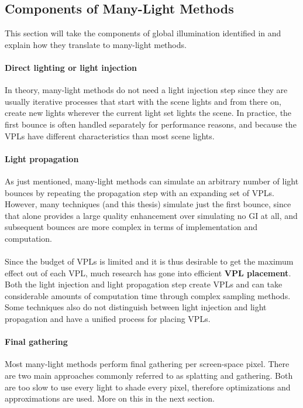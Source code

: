 \subsection{Components of Many-Light Methods}
This section will take the components of global illumination identified in  and explain how they translate to many-light methods.

\paragraph{Direct lighting or light injection}
In theory, many-light methods do not need a light injection step since they are usually iterative processes that start with the scene lights and from there on, create new lights wherever the current light set lights the scene. In practice, the first bounce is often handled separately for performance reasons, and because the VPLs have different characteristics than most scene lights.

\paragraph{Light propagation}
As just mentioned, many-light methods can simulate an arbitrary number of light bounces by repeating the propagation step with an expanding set of VPLs. However, many techniques (and this thesis) simulate just the first bounce, since that alone provides a large quality enhancement over simulating no GI at all, and subsequent bounces are more complex in terms of implementation and computation.
\\
\\
Since the budget of VPLs is limited and it is thus desirable to get the maximum effect out of each VPL, much research has gone into efficient \textbf{VPL placement}. Both the light injection and light propagation step create VPLs and can take considerable amounts of computation time through complex sampling methods. Some techniques also do not distinguish between light injection and light propagation and have a unified process for placing VPLs.

\paragraph{Final gathering}
Most many-light methods perform final gathering per screen-space pixel. There are two main approaches commonly referred to as splatting and gathering. Both are too slow to use every light to shade every pixel, therefore optimizations and approximations are used. More on this in the next section.

